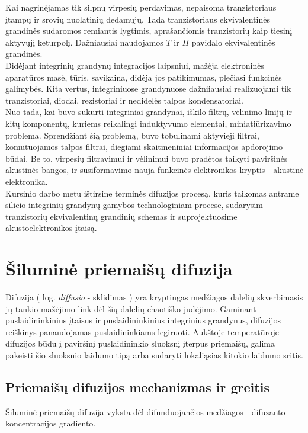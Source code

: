 \documentclass[11pt,a4paper]{article}
\begin{document}
Kai nagrinėjamas tik silpnų virpesių perdavimas, nepaisoma tranzistoriaus įtampų ir srovių nuolatinių dedamųjų. 
Tada tranzistoriaus ekvivalentinės grandinės sudaromos remiantis lygtimis, aprašančiomis tranzistorių kaip tiesinį 
aktyvųjį keturpolį. Dažniausiai naudojamos $T$ ir $\Pi$ pavidalo ekvivalentinės grandinės.\\

Didėjant integrinių grandynų integracijos laipsniui, mažėja elektroninės aparatūros masė, tūris, savikaina, didėja jos patikimumas, 
plečiasi funkcinės galimybės. Kita vertus, integriniuose grandynuose dažniiausiai realizuojami tik tranzistoriai, diodai, rezistoriai 
ir nedidelės talpos kondensatoriai.\\

Nuo tada, kai buvo sukurti integriniai grandynai, iškilo filtrų, vėlinimo linijų ir kitų komponentų, kuriems reikalingi 
induktyvumo elementai, miniatiūrizavimo problema. Sprendžiant šią problemą, buvo tobulinami aktyvieji filtrai, 
komutuojamos talpos filtrai, diegiami skaitmeniniai informacijos apdorojimo būdai. Be to, virpesių 
filtravimui ir vėlinimui buvo pradėtos taikyti paviršinės akustinės bangos, ir susiformavimo nauja funkcinės elektronikos 
kryptis - akustinė elektronika.\\

Kursinio darbo metu ištirsine terminės difuzijos procesą, kuris taikomas antrame silicio integrinių grandynų 
gamybos technologiniam procese, sudarysim tranzistorių ekvivalentinų grandinių schemas ir suprojektuosime akustoelektronikos įtaisą.\\

\section{Šiluminė priemaišų difuzija}
Difuzija ( log. \emph{diffusio} - sklidimas ) yra kryptingas medžiagos dalelių skverbimasis jų tankio mažėjimo 
link dėl šių dalelių chaotiško judėjimo. Gaminant puslaidininkinius įtaisus ir puslaidininkinius integrinius grandynus, 
difuzijos reiškinys panaudojamas puslaidininkiams legiruoti. Aukštoje temperatūroje difuzijos būdu į 
paviršinį puslaidininkio sluoksnį įterpus priemaišų, galima pakeisti šio sluoksnio laidumo tipą arba sudaryti lokaliąsias kitokio laidumo sritis.
\subsection{Priemaišų difuzijos mechanizmas ir greitis}
Šiluminė priemaišų difuzija vyksta dėl difunduojančios medžiagos - difuzanto - koncentracijos gradiento.\\
\end{document}

